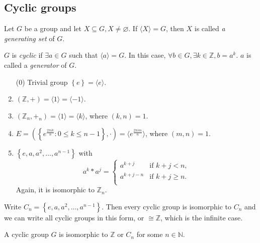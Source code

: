 \documentclass[10pt]{article}
\def\le{\leqslant}
\def\ge{\geqslant}
\begin{document}
    \subsection{Cyclic groups}
    \begin{definition}
        Let $G$ be a group and let $ X \subseteq G, X\neq \varnothing $. If $ \langle X \rangle =G $, then $X$ is called \textit{a generating set} of $G$.

        $G$ is \textit{cyclic} if $\exists a\in G$ such that $ \langle a \rangle =G $. In this case, $ \forall b\in G, \exists k\in \mathbb{Z} , b=a^k $. $a$ is called a \textit{generator} of $G$.
    \end{definition}
    \begin{example}
        \begin{enumerate}[(1)]
            \item[(0)] Trivial group $ \left\{ e\right\}=\langle e \rangle  $.
            \item $ (\mathbb{Z} ,+)=\langle 1 \rangle =\langle -1 \rangle  $.
            \item $ (\mathbb{Z}_n, +_n)=\langle 1 \rangle =\langle k \rangle $, where $(k,n)=1$.
            \item $ E=\left(\left\{ e^{\frac{2\pi ik}{n}}:0\le k\le n-1 \right\}, \cdot\right) =\langle e^{\frac{2\pi i m}{n}} \rangle $, where $(m,n)=1$.
            \item $ \left\{ e,a,a^2,\dots, a^{n-1}\right\} $ with
            \[
                a^k * a^j = \begin{cases}
                a^{k+j} &\text{if } k+j<n,\\
                a^{k+j-n} &\text{if } k+j\ge n.\\
                \end{cases} 
            \]
            Again, it is isomorphic to $ \mathbb{Z}_n $.
        \end{enumerate}
    \end{example}
    Write $ C_n = \left\{ e,a,a^2,\dots, a^{n-1}\right\} $. Then every cyclic group is isomorphic to $C_n$ and we can write all cyclic groups in this form, or $ \cong \mathbb{Z} $, which is the infinite case.
    \begin{theorem}\label{thm:cyclic group isom}
        A cyclic group $G$ is isomorphic to $ \mathbb{Z}  $ or $ C_n $ for some $ n\in \mathbb{N} $.
    \end{theorem}
\end{document}
